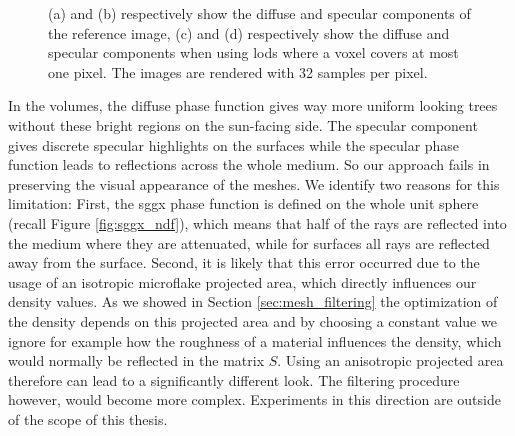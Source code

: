 \begin{figure}[t]
\begin{subfigure}[b]{0.49\linewidth}
        \caption{}
    \end{subfigure}
    \caption[Diffuse and specular components rendered separately]{(a) and (b) respectively show the diffuse and specular components of the reference image, (c) and (d) respectively show the diffuse and specular components when using \acsp{lod} where a voxel covers at most one pixel. The images are rendered with 32 samples per pixel.}
	\label{fig:diffuse_specular_breakdown}
\end{figure}
In the volumes, the diffuse phase function gives way more uniform looking trees without these bright regions on the sun-facing side.
The specular component gives discrete specular highlights on the surfaces while the specular phase function leads to reflections across the whole medium.
So our approach fails in preserving the visual appearance of the meshes.
We identify two reasons for this limitation: First, the \ac{sggx} phase function is defined on the whole unit sphere (recall Figure \ref{fig:sggx_ndf}), which means that half of the rays are reflected into the medium where they are attenuated, while for surfaces all rays are reflected away from the surface.
Second, it is likely that this error occurred due to the usage of an isotropic microflake projected area, which directly influences our density values.
As we showed in Section \ref{sec:mesh_filtering} the optimization of the density depends on this projected area and by choosing a constant value we ignore for example how the roughness of a material influences the density, which would normally be reflected in the matrix $S$. %
Using an anisotropic projected area therefore can lead to a significantly different look.
The filtering procedure however, would become more complex.
Experiments in this direction are outside of the scope of this thesis.


